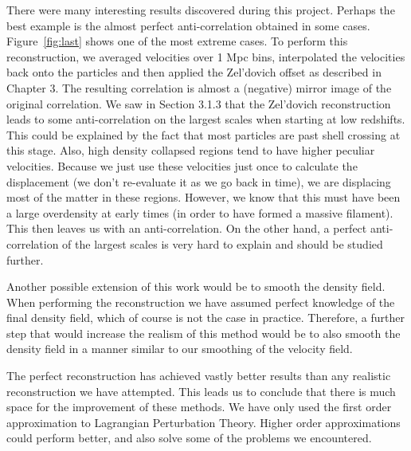 There were many interesting results discovered during this project. Perhaps the best example is the almost perfect anti-correlation obtained in some cases. Figure~\ref{fig:last} shows one of the most extreme cases. To perform this reconstruction, we averaged velocities over 1 Mpc bins, interpolated the velocities back onto the particles and then applied the Zel'dovich offset as described in Chapter 3. The resulting correlation is almost a (negative) mirror image of the original correlation. We saw in Section 3.1.3 that the Zel'dovich reconstruction leads to some anti-correlation on the largest scales when starting at low redshifts. This could be explained by the fact that most particles are past shell crossing at this stage. Also, high density collapsed regions tend to have higher peculiar velocities. Because we just use these velocities just once to calculate the displacement (we don't re-evaluate it as we go back in time), we are displacing most of the matter in these regions. However, we know that this must have been a large overdensity at early times (in order to have formed a massive filament). This then leaves us with an anti-correlation. On the other hand, a perfect anti-correlation of the largest scales is very hard to explain and should be studied further. 

Another possible extension of this work would be to smooth the density field. When performing the reconstruction we have assumed perfect knowledge of the final density field, which of course is not the case in practice. Therefore, a further step that would increase the realism of this method would be to also smooth the density field in a manner similar to our smoothing of the velocity field.

The perfect reconstruction has achieved vastly better results than any realistic reconstruction we have attempted. This leads us to conclude that there is much space for the improvement of these methods. We have only used the first order approximation to Lagrangian Perturbation Theory. Higher order approximations could perform better, and also solve some of the problems we encountered.
    
